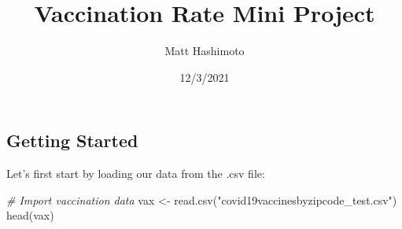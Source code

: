 \documentclass[
]{article}
\title{Vaccination Rate Mini Project}
\author{Matt Hashimoto}
\date{12/3/2021}
\newenvironment{Shaded}{\begin{snugshade}}{\end{snugshade}}
\newcommand{\CommentTok}[1]{\textcolor[rgb]{0.56,0.35,0.01}{\textit{#1}}}
\newcommand{\FunctionTok}[1]{\textcolor[rgb]{0.00,0.00,0.00}{#1}}
\newcommand{\NormalTok}[1]{#1}
\newcommand{\OtherTok}[1]{\textcolor[rgb]{0.56,0.35,0.01}{#1}}
\newcommand{\StringTok}[1]{\textcolor[rgb]{0.31,0.60,0.02}{#1}}
\begin{document}
\maketitle

\hypertarget{getting-started}{%
\subsection{Getting Started}\label{getting-started}}

Let's first start by loading our data from the .csv file:

\begin{Shaded}
\begin{Highlighting}[]
\CommentTok{\# Import vaccination data}
\NormalTok{vax }\OtherTok{\textless{}{-}} \FunctionTok{read.csv}\NormalTok{(}\StringTok{"covid19vaccinesbyzipcode\_test.csv"}\NormalTok{)}
\FunctionTok{head}\NormalTok{(vax)}
\end{Highlighting}
\end{Shaded}
\end{document}
